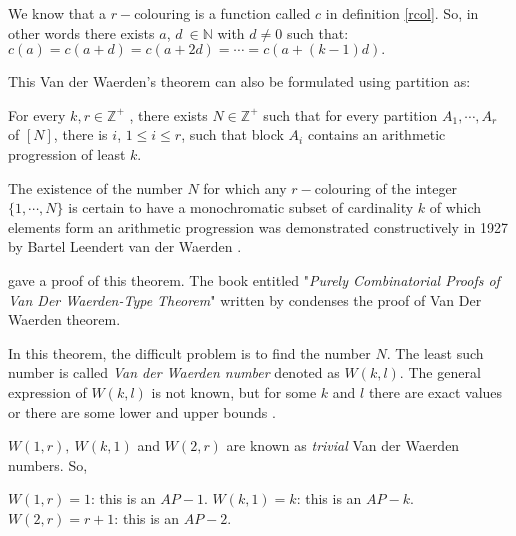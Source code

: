 
We know that a $r-$colouring is a function called $c$ in definition \eqref{rcol}. So, in other words there exists $a$,  $d \ \in \mathbb{N}$ with $d\neq 0$ such that: $c(a)=c(a+d)=c(a+2d)=\cdots =c(a+(k-1)d).$

This Van der Waerden's theorem can also be formulated using partition \citep{dransfield2004} as:

\begin{thm}
For every $k, r \in \mathbb{Z}^+$ , there exists $N \in \mathbb{Z}^+$ such that for every partition $A_1, \cdots , A_r$ of $[N]$, there is $i$, $1 \leq i \leq r$, such that block $A_i$ contains an arithmetic progression of  least $k$.   \label{vd2}
\end{thm}


The existence of the number $N$ for which any $r-$colouring of the integer $\{1, \cdots, N\}$ is certain to have a monochromatic subset of cardinality $k$ of which elements form an arithmetic progression was demonstrated constructively in 1927 by Bartel Leendert van der Waerden \cite{van1927beweis}.

\cite{graham1974short} gave a proof of this theorem. The book entitled "\textit{Purely Combinatorial Proofs of Van Der Waerden-Type Theorem}" written by \cite{gasarch2010purely} condenses  the proof of Van Der Waerden theorem.


In this theorem, the difficult problem is to find the number $N$. The least such number is called \textit{Van der Waerden number} denoted as $W(k,l).$ The general expression of $W(k,l)$ is not known, but for some $k$ and $l$ there are exact values or there are some lower and upper bounds \citep{dransfield2004}.


$W(1,r), \ W(k,1)$ and $W(2,r)$ are known as \textit{trivial} Van der Waerden numbers. So, 

$W(1,r)=1$: this is an $AP-1$.  $W(k,1)=k$: this is an $AP-k$. $W(2,r)=r+1$: this is an $AP-2.$
 

